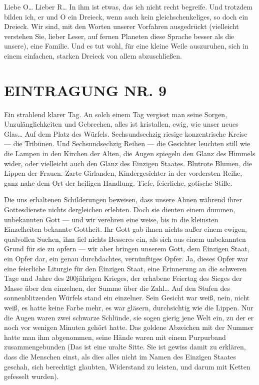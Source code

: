 Liebe O\ldots{} Lieber R\ldots{} In ihm ist etwas, das ich nicht recht
begreife. Und trotzdem bilden ich, er und O ein Dreieck, wenn auch
kein gleichschenkeliges, so doch ein Dreieck. Wir sind, mit den
Worten unserer Vorfahren ausgedrückt (vielleicht verstehen Sie,
lieber Leser, auf fernen Planeten diese Sprache besser als die
unsere), eine Familie. Und es tut wohl, für eine kleine Weile
auszuruhen, sich in einem einfachen, starken Dreieck von allem
abzuschließen.

\section{EINTRAGUNG NR. 9}

Ein strahlend klarer Tag. An solch einem Tag vergisst man seine
Sorgen, Unzulänglichkeiten und Gebrechen, alles ist kristallen,
ewig, wie unser neues Glas\ldots{} Auf dem Platz des Würfels.
Sechsundsechzig riesige konzentrische Kreise — die Tribünen. Und
Sechsundsechzig Reihen — die Gesichter leuchten still wie die Lampen in den Kirchen
der Alten, die Augen spiegeln den Glanz des Himmels wider, oder
vielleicht auch den Glanz des Einzigen Staates. Blutrote Blumen,
die Lippen der Frauen. Zarte Girlanden, Kindergesichter in der
vordersten Reihe, ganz nahe dem Ort der heiligen Handlung. Tiefe,
feierliche, gotische Stille.

Die uns erhaltenen Schilderungen beweisen, dass unsere Ahnen
während ihrer Gottesdienste nichts dergleichen erlebten. Doch sie
dienten einem dummen, unbekannten Gott — und wir verehren eine
weise, bis in die kleinsten Einzelheiten bekannte Gottheit. Ihr
Gott gab ihnen nichts außer einem ewigen, qualvollen Suchen, ihm
fiel nichts Besseres ein, als sich aus einem unbekannten Grund für
sie zu opfern — wir aber bringen unserem Gott, dem Einzigen Staat,
ein Opfer dar, ein genau durchdachtes, vernünftiges Opfer. Ja,
dieses Opfer war eine feierliche Liturgie für den Einzigen Staat,
eine Erinnerung an die schweren Tage und Jahre des 200jährigen
Krieges, der erhabene Feiertag des Sieges der Masse über den
einzelnen, der Summe über die Zahl\ldots{} Auf den Stufen des
sonnenblitzenden Würfels stand ein einzelner. Sein Gesicht war
weiß, nein, nicht weiß, es hatte keine Farbe mehr, es war gläsern,
durchsichtig wie die Lippen. Nur die Augen waren zwei schwarze
Schlünde, sie sogen gierig jene Welt ein, zu der er noch vor
wenigen Minuten gehört hatte. Das goldene Abzeichen mit der Nummer
hatte man ihm abgenommen, seine Hände waren mit einem Purpurband
zusammengebunden (Das ist eine uralte Sitte. Sie ist gewiss damit
zu erklären, dass die Menschen einst, als dies alles nicht im Namen
des Einzigen Staates geschah, sich berechtigt glaubten, Widerstand
zu leisten, und darum mit Ketten gefesselt wurden).

